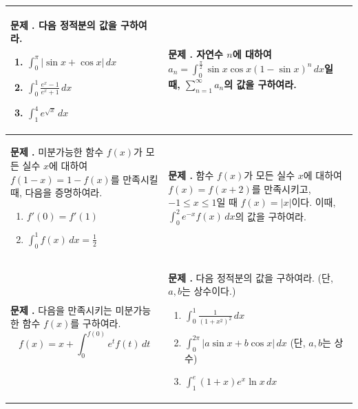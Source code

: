 \documentclass[10pt, a4paper]{article}
\newcounter{probcount}
\newcommand{\exercise}[1]{%
    \stepcounter{probcount}%
    \begin{minipage}[t][110mm][t]{0.44\textwidth}
        \small 
        \vspace{1mm}
        \noindent \textbf{문제 \arabic{probcount}.} #1
    \end{minipage}%
    }
\begin{document}
\noindent
\begin{longtable}{p{} | p{}}
    
    \exercise{다음 정적분의 값을 구하여라.
    \begin{enumerate} [label=(\arabic*), leftmargin=8mm, nosep]
        \item $\displaystyle \int_{0}^{\pi} |\sin x + \cos x| \, dx$
        \item $\displaystyle \int_{0}^{1} \frac{e^x - 1}{e^x + 1} \, dx$
        \item $\displaystyle \int_{1}^{4} e^{\sqrt{x}} \, dx$
    \end{enumerate}}
    & 
    \exercise{자연수 $n$에 대하여 $a_n = \int_{0}^{\frac{\pi}{2}} \sin x \cos x (1-\sin x)^n \, dx$일 때, $\sum_{n=1}^{\infty} a_n$의 값을 구하여라.} \\
    \hline 
    
    \exercise{미분가능한 함수 $f(x)$가 모든 실수 $x$에 대하여 $f(1-x) = 1-f(x)$를 만족시킬 때, 다음을 증명하여라.
\begin{enumerate} [label=(\arabic*), leftmargin=8mm, nosep]
    \item $f'(0) = f'(1)$
    \item $\int_{0}^{1} f(x) \, dx = \frac{1}{2}$
\end{enumerate}} 
    & 
    \exercise{함수 $f(x)$가 모든 실수 $x$에 대하여 $f(x) = f(x+2)$를 만족시키고, $-1 \le x \le 1$일 때 $f(x) = |x|$이다. 이때, $\int_{0}^{2} e^{-x} f(x) \, dx$의 값을 구하여라.} \\
    
    \exercise{다음을 만족시키는 미분가능한 함수 $f(x)$를 구하여라.
\begin{equation*}
    f(x) = x + \int_{0}^{f(0)} e^t f(t) \, dt
\end{equation*}} 
    & 
    \exercise{다음 정적분의 값을 구하여라. (단, $a, b$는 상수이다.)
\begin{enumerate} [label=(\arabic*), leftmargin=8mm, nosep]
    \item $\displaystyle \int_{0}^{1} \frac{1}{(1+x^2)^2} \, dx$
    \item $\displaystyle \int_{0}^{2\pi} |a \sin x + b \cos x| \, dx$ (단, $a, b$는 상수)
    \item $\displaystyle \int_{1}^{e} (1+x)e^x \ln x \, dx$
\end{enumerate}} \\
\hline


\end{longtable}
\end{document}
